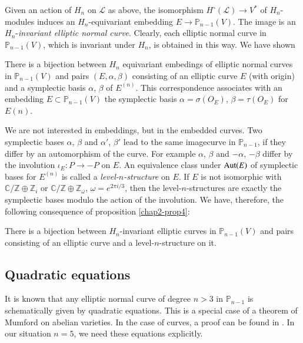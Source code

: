 Given an action of $H_{n}$ on $\mathscr{L}$ as above, the isomorphism
$H^{\circ}(\mathscr{L})\to V^{*}$ of $H_{n}$-modules induces an
$H_{n}$-equivariant embedding $E\to \mathbb{P}_{n-1}(V)$. The image is
an $H_{n}$-{\em invariant elliptic normal curve}. Clearly, each
elliptic normal curve in $\mathbb{P}_{n-1}(V)$, which is invariant
under $H_{n}$, is obtained in this way. We have shown 

\begin{proposition}\label{chap2-prop4}
There is a bijection between $H_{n}$ equivariant embedings of elliptic
normal curves in $\mathbb{P}_{n-1}(V)$ and pairs $(E,\alpha,\beta)$
consisting of an elliptic curve $E$ (with origin) and a symplectic
basis $\alpha$, $\beta$ of $E^{(n)}$. This correspondence associates
with an embedding $E\subset \mathbb{P}_{n-1}(V)$ the symplectic basis
$\alpha=\sigma(O_{E})$, $\beta=\tau(O_{E})$ for $E(n)$. 
\end{proposition}

We are not interested in embeddings, but in the embedded curves. Two
symplectic bases $\alpha$, $\beta$ and $\alpha'$, $\beta'$ lead to the
same image\pageoriginale curve in $\mathbb{P}_{n-1}$, if they differ
by an automorphism of the curve. For example $\alpha$, $\beta$ and
$-\alpha$, $-\beta$ differ by the involution $\iota_{E}:P\to -P$ on
$E$. An equivalence class under $\operatorname{Aut}(E)$ of symplectic bases for
$E^{(n)}$ is called a {\em level-$n$-structure} on $E$. If $E$ is not
isomorphic with $\mathbb{C}/\mathbb{Z}\oplus \mathbb{Z}_{i}$ or
$\mathbb{C}/\mathbb{Z}\oplus\mathbb{Z}_{\omega}$, $\omega=e^{2\pi
i/3}$, then the level-$n$-structures are exactly the symplectic bases
modulo the action of the involution. We have, therefore, the following
consequence of proposition \ref{chap2-prop4}:

\begin{proposition}\label{chap2-prop5}
There is a bijection between $H_{n}$-invariant elliptic curves in
$\mathbb{P}_{n-1}(V)$ and pairs consisting of an elliptic curve and a
level-$n$-structure on it.
\end{proposition}

\subsection{Quadratic equations}\label{chap2-sec3.3}

It is known that any elliptic normal curve of degree $n>3$ in
$\mathbb{P}_{n-1}$ is schematically given by quadratic equations. This
is a special case of a theorem of Mumford \cite[p.349]{chap2-key8} on
abelian varieties. In the case of curves, a proof can be found
in \cite[lemma IV. 1.1]{chap2-key7}. In our situation $n=5$, we need
these equations explicitly.

